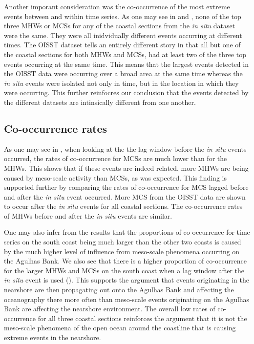 \documentclass[a4paper,10pt,review]{elsarticle}
\begin{document}
Another imporant consideration was the co-occurrence of the most extreme events between and within time series. As one may see in  and , none of the top three MHWs or MCSs for any of the coastal sections from the \emph{in situ} dataset were the same. They were all inidvidually different events occurring at different times. The OISST dataset tells an entirely different story in that all but one of the coastal sections for both MHWs and MCSs, had at least two of the three top events occurring at the same time. This means that the largest events detected in the OISST data were occurring over a broad area at the same time whereas the \emph{in situ} events were isolated not only in time, but in the location in which they were occurring. This further reinfocres our conclusion that the events detected by the different datasets are intinsically different from one another.

\subsection{Co-occurrence rates}
As one may see in , when looking at the the lag window before the \emph{in situ} events occurred, the rates of co-occurrence for MCSs are much lower than for the MHWs. This shows that if these events are indeed related, more MHWs are being caused by meso-scale activity than MCSs, as was expected. This finding is supported further by comparing the rates of co-occurrence for MCS lagged before and after the \emph{in situ} event occurred. More MCS from the OISST data are shown to occur after the \emph{in situ} events for all coastal sections. The co-occurrence rates of MHWs before and after the \emph{in situ} events are similar.

One may also infer from the results that the proportions of co-occurrence for time series on the south coast being much larger than the other two coasts is caused by the much higher level of influence from meso-scale phenomena occurring on the Agulhas Bank. We also see that there is a higher proportion of co-occurrence for the larger MHWs and MCSs on the south coast when a lag window after the \emph{in situ} event is used (). This supports the argument that events originating in the nearshore are then propagating out onto the Agulhas Bank and affecting the oceanography there more often than meso-scale events originating on the Agulhas Bank are affecting the nearshore environment. The overall low rates of co-occurrence for all three coastal sections reinforces the argument that it is not the meso-scale phenomena of the open ocean around the coastline that is causing extreme events in the nearshore.
\end{document}
